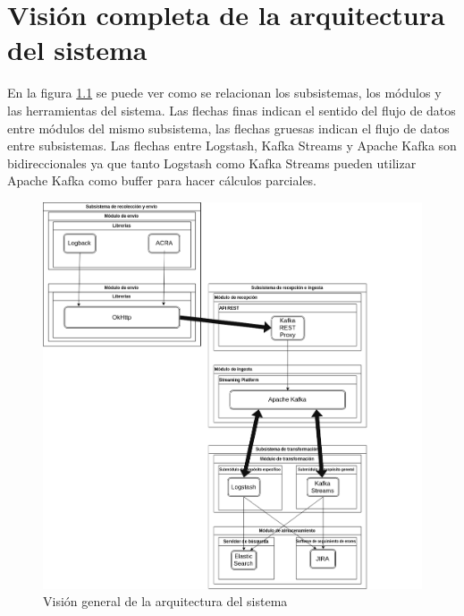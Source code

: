 \chapter{Visión completa de la arquitectura del sistema}

En la figura \ref{fig:arqfinal} se puede ver como se relacionan los subsistemas, los módulos y las herramientas del sistema. Las flechas finas indican el sentido del flujo de datos entre módulos del mismo subsistema, las flechas gruesas indican el flujo de datos entre subsistemas. Las flechas entre Logstash, Kafka Streams y Apache Kafka son bidireccionales ya que tanto Logstash como Kafka Streams pueden utilizar Apache Kafka como buffer para hacer cálculos parciales. 

\begin{figure}[!htb]
	
	\includegraphics[width=\linewidth] {Moduloss-estructura-todos.png}
	\caption{Visión general de la arquitectura del sistema}
	\label{fig:arqfinal}
\end{figure}